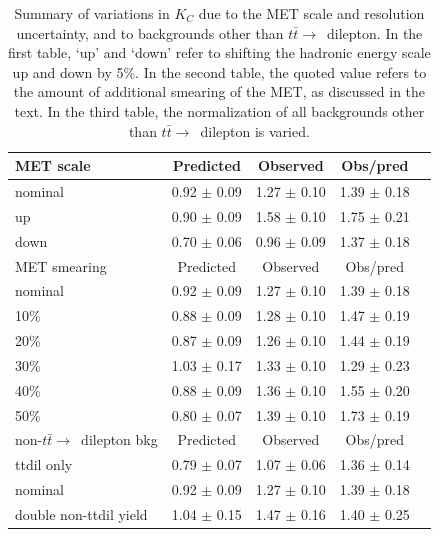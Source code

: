 \begin{table}[htb]
\begin{center}
\caption{\label{tab:victorysyst} 
Summary of variations in $K_C$ due to the MET scale and resolution uncertainty, and to backgrounds other than $t\bar{t} \to$~dilepton. 
In the first table, `up' and `down' refer to shifting the hadronic energy scale up and down by 5\%. In the second table, the quoted value 
refers to the amount of additional smearing of the MET, as discussed in the text. In the third table, the normalization of all backgrounds
other than $t\bar{t} \to$~dilepton is varied. }
\begin{tabular}{ lcccc }
\hline
       MET scale  &      Predicted       &       Observed       &       Obs/pred       \\
\hline
        nominal   &  0.92 $ \pm $ 0.09   &  1.27 $ \pm $ 0.10   &   1.39 $ \pm $ 0.18  \\
            up    &  0.90 $ \pm $ 0.09   &  1.58 $ \pm $ 0.10   &   1.75 $ \pm $ 0.21  \\
          down    &  0.70 $ \pm $ 0.06   &  0.96 $ \pm $ 0.09   &   1.37 $ \pm $ 0.18  \\
\hline
   MET smearing   &      Predicted       &       Observed       &       Obs/pred       \\
\hline
        nominal   &  0.92 $ \pm $ 0.09   &  1.27 $ \pm $ 0.10   &   1.39 $ \pm $ 0.18  \\
           10\%   &  0.88 $ \pm $ 0.09   &  1.28 $ \pm $ 0.10   &   1.47 $ \pm $ 0.19  \\
           20\%   &  0.87 $ \pm $ 0.09   &  1.26 $ \pm $ 0.10   &   1.44 $ \pm $ 0.19  \\
           30\%   &  1.03 $ \pm $ 0.17   &  1.33 $ \pm $ 0.10   &   1.29 $ \pm $ 0.23  \\
           40\%   &  0.88 $ \pm $ 0.09   &  1.36 $ \pm $ 0.10   &   1.55 $ \pm $ 0.20  \\
           50\%   &  0.80 $ \pm $ 0.07   &  1.39 $ \pm $ 0.10   &   1.73 $ \pm $ 0.19  \\
\hline
  non-$t\bar{t} \to$~dilepton bkg   &       Predicted   &           Observed   &           Obs/pred   \\ 
\hline
   ttdil only                       &   0.79 $ \pm $ 0.07   &   1.07 $ \pm $ 0.06   &   1.36 $ \pm $ 0.14   \\
   nominal                          &   0.92 $ \pm $ 0.09   &   1.27 $ \pm $ 0.10   &   1.39 $ \pm $ 0.18   \\
   double non-ttdil yield           &   1.04 $ \pm $ 0.15   &   1.47 $ \pm $ 0.16   &   1.40 $ \pm $ 0.25   \\
\hline
\end{tabular}
\end{center}
\end{table}

